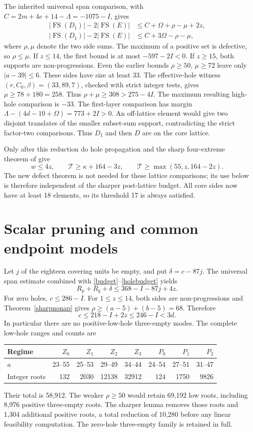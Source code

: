 \documentclass[11pt,a4paper]{article}
\newcommand{\FS}{\operatorname{FS}}
\newcommand{\T}{\mathcal T}
\begin{document}
The inherited universal span comparison, with
$C=2m+4e+14-\Lambda=-1075-I$, gives
\begin{align*}
 |\FS(D_1)|-2|\FS(E)|&\le C+\Omega+\rho-\mu+2z,\\
 |\FS(D_1)|-2|\FS(E)|&\le C+3\Omega-\rho-\mu,
\end{align*}
where $\rho,\mu$ denote the two side sums. The maximum of a positive
set is defective, so $\rho\le\mu$. If $z\le14$, the first bound is
at most $-597-2I<0$. If $z\ge15$, both supports are non-progressions.
Even the earlier bounds $\rho\ge50$, $\mu\ge72$ leave only
$|a-39|\le6$. These sides have size at least 33. The effective-hole
witness $(r,C_0,\beta)=(33,89,7)$, checked with strict integer tests,
gives $\mu\ge78+180=258$. Thus $\rho+\mu\ge308>275-4I$.
The maximum resulting high-hole comparison is $-33$.
The first-layer comparison has margin
$\Lambda-(4d-10+\Omega)=773+2I>0$.
An off-lattice element would give two disjoint translates of the smaller
subset-sum support, contradicting the strict factor-two comparisons.
Thus $D_1$ and then $D$ are on the core lattice.

Only after this reduction do hole propagation and the sharp
four-extreme theorem of \cite{previous} give
\begin{equation}\label{holebudget}
 w\le4z,\qquad \T\ge\kappa+164-3z,
 \qquad \T\ge\max(55,z,164-2z).
\end{equation}
The new defect theorem is not needed for these lattice comparisons;
its use below is therefore independent of the sharper post-lattice
budget. All core sides now have at least 18 elements, so its
threshold 17 is always satisfied.

\section{Scalar pruning and common endpoint models}
Let $j$ of the eighteen covering units be empty, and put
$\delta=c-87j$. The universal span estimate combined with
\eqref{budget}--\eqref{holebudget} yields
\[
 R_p+R_q+\delta\le368-I-87j+4z.
\]
For zero holes, $c\le286-I$. For $1\le z\le14$, both sides are
non-progressions and Theorem~\ref{sharpnonap} gives
$\rho\ge(a-5)+(b-5)=68$. Therefore
\[
 c\le218-I+2z\le246-I<3d.
\]
In particular there are no positive-low-hole three-empty modes.
The complete low-hole ranges and counts are
\begin{center}\small
\begin{tabular}{lrrrrrrr}\toprule
Regime&$Z_0$&$Z_1$&$Z_2$&$Z_3$&$P_0$&$P_1$&$P_2$\\\midrule
$a$&23--55&25--53&29--49&34--44&24--54&27--51&31--47\\
Integer roots&132&2030&12138&32912&124&1750&9826\\\bottomrule
\end{tabular}
\end{center}
Their total is 58,912. The weaker $\rho\ge50$ would retain 69,192
low roots, including 8,976 positive three-empty roots. The sharper
lemma removes those roots and 1,304 additional positive roots,
a total reduction of 10,280 before any linear feasibility computation.
The zero-hole three-empty family is retained in full.
\end{document}
